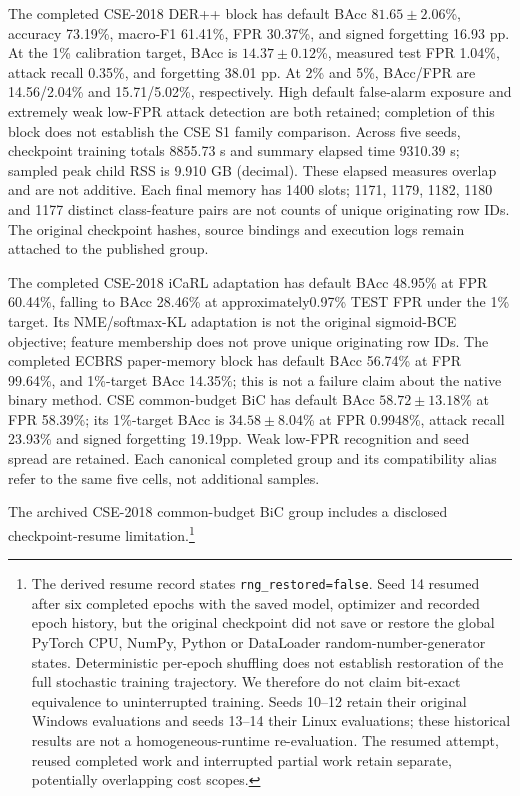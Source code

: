 \documentclass[10pt,twocolumn]{article}
\begin{document}
The completed CSE-2018 DER++ block has default BAcc $81.65\pm2.06$\%, accuracy 73.19\%, macro-F1 61.41\%, FPR 30.37\%, and signed forgetting 16.93 pp. At the 1\% calibration target, BAcc is $14.37\pm0.12$\%, measured test FPR 1.04\%, attack recall 0.35\%, and forgetting 38.01 pp. At 2\% and 5\%, BAcc/FPR are 14.56/2.04\% and 15.71/5.02\%, respectively. High default false-alarm exposure and extremely weak low-FPR attack detection are both retained; completion of this block does not establish the CSE S1 family comparison. Across five seeds, checkpoint training totals 8855.73 s and summary elapsed time 9310.39 s; sampled peak child RSS is 9.910 GB (decimal). These elapsed measures overlap and are not additive. Each final memory has 1400 slots; 1171, 1179, 1182, 1180 and 1177 distinct class-feature pairs are not counts of unique originating row IDs. The original checkpoint hashes, source bindings and execution logs remain attached to the published group.

The completed CSE-2018 iCaRL adaptation has default BAcc 48.95\% at FPR 60.44\%, falling to BAcc 28.46\% at approximately0.97\% TEST FPR under the 1\% target. Its NME/softmax-KL adaptation is not the original sigmoid-BCE objective; feature membership does not prove unique originating row IDs. The completed ECBRS paper-memory block has default BAcc 56.74\% at FPR 99.64\%, and 1\%-target BAcc 14.35\%; this is not a failure claim about the native binary method. CSE common-budget BiC has default BAcc $58.72\pm13.18$\% at FPR 58.39\%; its 1\%-target BAcc is $34.58\pm8.04$\% at FPR 0.9948\%, attack recall 23.93\% and signed forgetting 19.19pp. Weak low-FPR recognition and seed spread are retained. Each canonical completed group and its compatibility alias refer to the same five cells, not additional samples.

The archived CSE-2018 common-budget BiC group includes a disclosed checkpoint-resume limitation.\footnote{The derived resume record states \texttt{rng\_restored=false}. Seed 14 resumed after six completed epochs with the saved model, optimizer and recorded epoch history, but the original checkpoint did not save or restore the global PyTorch CPU, NumPy, Python or DataLoader random-number-generator states. Deterministic per-epoch shuffling does not establish restoration of the full stochastic training trajectory. We therefore do not claim bit-exact equivalence to uninterrupted training. Seeds 10--12 retain their original Windows evaluations and seeds 13--14 their Linux evaluations; these historical results are not a homogeneous-runtime re-evaluation. The resumed attempt, reused completed work and interrupted partial work retain separate, potentially overlapping cost scopes.}
\end{document}
